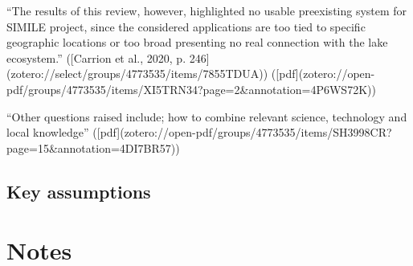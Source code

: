 {“The results of this review, however, highlighted no usable preexisting system for SIMILE project, since the considered applications are too tied to specific geographic locations or too broad presenting no real connection with the lake ecosystem.” ([Carrion et al., 2020, p. 246](zotero://select/groups/4773535/items/7855TDUA)) ([pdf](zotero://open-pdf/groups/4773535/items/XI5TRN34?page=2&annotation=4P6WS72K))

“Other questions raised include; how to combine relevant science, technology and local knowledge” ([pdf](zotero://open-pdf/groups/4773535/items/SH3998CR?page=15&annotation=4DI7BR57))


\subsection{Key assumptions}




\section{Notes}

}

